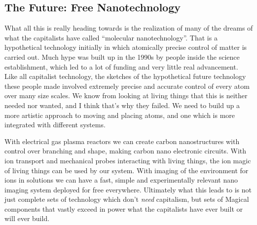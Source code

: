 \subsection{The Future: Free
Nanotechnology}\label{the-future-free-nanotechnology}

What all this is really heading towards is the realization of many of
the dreams of what the capitalists have called ``molecular
nanotechnology''. That is a hypothetical technology initially in which
atomically precise control of matter is carried out. Much hype was built
up in the 1990s by people inside the science establishment, which led to
a lot of funding and very little real advancement. Like all capitalist
technology, the sketches of the hypothetical future technology these
people made involved extremely precise and accurate control of every
atom over many size scales. We know from looking at living things that
this is neither needed nor wanted, and I think that's why they failed.
We need to build up a more artistic approach to moving and placing
atoms, and one which is more integrated with different systems.

With electrical gas plasma reactors we can create carbon nanostructures
with control over branching and shape, making carbon nano electronic
circuits. With ion transport and mechanical probes interacting with
living things, the ion magic of living things can be used by our system.
With imaging of the environment for ions in solutions we can have a
fast, simple and experimentally relevant nano imaging system deployed
for free everywhere. Ultimately what this leads to is not just complete
sets of technology which don't \emph{need} capitalism, but sets of
Magical components that vastly exceed in power what the capitalists have
ever built or will ever build.
